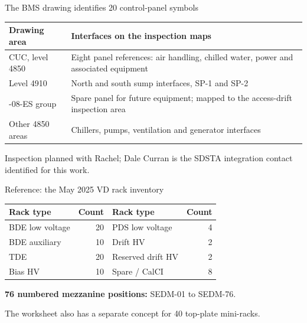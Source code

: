 \begin{frame}{The BMS drawing identifies 20 control-panel symbols}
  \renewcommand{\arraystretch}{1.4}
  \begin{tabularx}{\textwidth}{@{}>{\RaggedRight\arraybackslash}p{3.4cm}>{\RaggedRight\arraybackslash}X@{}}
    \toprule
    \textbf{Drawing area} & \textbf{Interfaces on the inspection maps}\\
    \midrule
    CUC, level 4850 & Eight panel references: air handling, chilled water, power and associated equipment\\
    Level 4910 & North and south sump interfaces, SP-1 and SP-2\\
    4850-08-ES group & Spare panel for future equipment; mapped to the access-drift inspection area\\
    Other 4850 areas & Chillers, pumps, ventilation and generator interfaces\\
    \bottomrule
  \end{tabularx}\par
  \medskip
  Inspection planned with Rachel; Dale Curran is the SDSTA integration contact identified for this work.
\end{frame}

\begin{frame}{Reference: the May 2025 VD rack inventory}
  \renewcommand{\arraystretch}{1.15}
  \begin{tabularx}{\textwidth}{@{}>{\RaggedRight\arraybackslash}Xr>{\RaggedRight\arraybackslash}Xr@{}}
    \toprule
    \textbf{Rack type} & \textbf{Count} & \textbf{Rack type} & \textbf{Count}\\
    \midrule
    BDE low voltage & 20 & PDS low voltage & 4\\
    BDE auxiliary & 10 & Drift HV & 2\\
    TDE & 20 & Reserved drift HV & 2\\
    Bias HV & 10 & Spare / CalCI & 8\\
    \bottomrule
  \end{tabularx}\par
  \bigskip
  \textbf{76 numbered mezzanine positions:} SEDM-01 to SEDM-76.\par
  \medskip
  The worksheet also has a separate concept for 40 top-plate mini-racks.
\end{frame}
